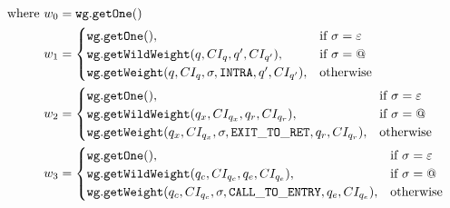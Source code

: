 \begin{align*}
\text{where }
w_0 &= \mathtt{wg.getOne}() \\
w_1 &= \begin{cases}
           \mathtt{wg.getOne}(), & \text{if } \sigma = \varepsilon \\
           \mathtt{wg.getWildWeight}(q,CI_q,q',CI_{q'}), & \text{if } \sigma = \text{\ensuremath{@}} \\
           \mathtt{wg.getWeight}(q,CI_q,\sigma, \mathtt{INTRA},q',CI_{q'}), & \text{otherwise}
       \end{cases} \\
w_2 &= \begin{cases}
          \mathtt{wg.getOne}(), & \text{if } \sigma = \varepsilon \\
          \mathtt{wg.getWildWeight}(q_x,CI_{q_x},q_r,CI_{q_r}), & \text{if } \sigma = \text{\ensuremath{@}} \\
          \mathtt{wg.getWeight}(q_x,CI_{q_x},\sigma, \mathtt{EXIT\_TO\_RET},q_r,CI_{q_r}), & \text{otherwise}
      \end{cases} \\
w_3 &= \begin{cases}
           \mathtt{wg.getOne}(), & \text{if } \sigma = \varepsilon \\
           \mathtt{wg.getWildWeight}(q_c,CI_{q_c},q_e,CI_{q_e}), & \text{if } \sigma = \text{\ensuremath{@}} \\
           \mathtt{wg.getWeight}(q_c,CI_{q_c},\sigma, \mathtt{CALL\_TO\_ENTRY},q_e,CI_{q_e}), & \text{otherwise}
      \end{cases} 
\end{align*}

